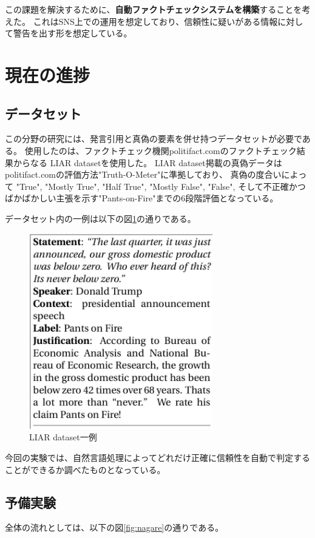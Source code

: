 \documentclass[twocolumn, a4paper, uplatex]{UECIEresume}
\begin{document}
この課題を解決するために、\textbf{自動ファクトチェックシステムを構築}することを考えた。
これはSNS上での運用を想定しており、信頼性に疑いがある情報に対して警告を出す形を想定している。

\section{現在の進捗}
\subsection{データセット}
この分野の研究には、発言引用と真偽の要素を併せ持つデータセットが必要である。
使用したのは、ファクトチェック機関politifact.comのファクトチェック結果からなる
LIAR datasetを使用した\cite{pants}。
LIAR dataset掲載の真偽データはpolitifact.comの評価方法"Truth-O-Meter"に準拠\cite{pants}しており、
真偽の度合いによって
"True", "Mostly True", "Half True", "Mostly False", "False",
そして不正確かつばかばかしい主張を示す"Pants-on-Fire"までの6段階評価となっている\cite{truth}。

データセット内の一例は以下の図\ref{fig:liar}の通りである。

\begin{figure}[h]
  \begin{center}
    \includegraphics[width=8cm]{fig_liar.jpg}
    \caption{LIAR dataset一例}
    \label{fig:liar}
  \end{center}
\end{figure}

今回の実験では、自然言語処理によってどれだけ正確に信頼性を自動で判定することができるか調べたものとなっている。

\subsection{予備実験}
全体の流れとしては、以下の図\ref{fig:nagare}の通りである。
\end{document}
